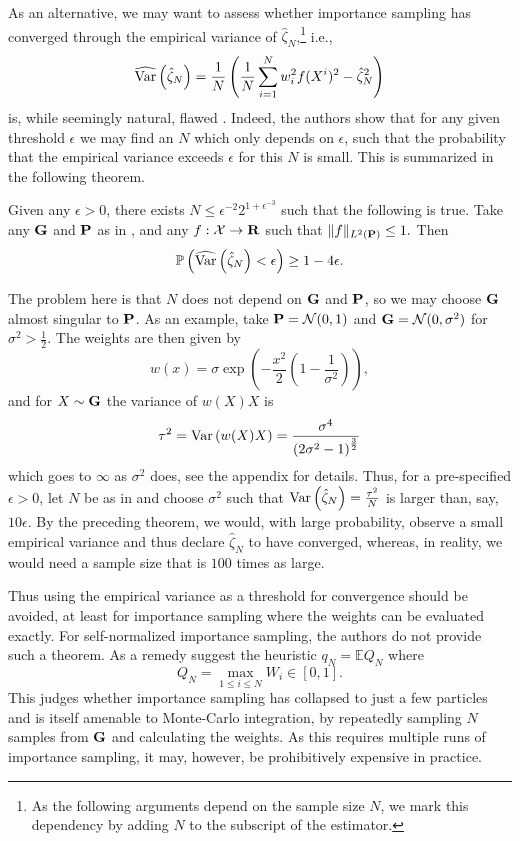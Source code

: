 As an alternative, we may want to assess whether importance sampling has converged through the empirical variance of $\hat \zeta_{N}$,\footnote{As the following arguments depend on the sample size $N$, we mark this dependency by adding $N$ to the subscript of the estimator.} i.e., 
$$
\widehat\var \left( \hat\zeta_{N} \right) = \frac{1}{N}\left(\frac{1}{N} \sum_{i = 1}^N w_{i}^{2} f(X^{i})^{2} - \hat \zeta_{N}^{2}\right)
$$
is, while seemingly natural, flawed \citep{Chatterjee2018Sample}.
Indeed, the authors show that for any given threshold $\epsilon$ we may find an $N$ which only depends on $\epsilon$, such that the probability that the empirical variance exceeds $\epsilon$ for this $N$ is small. This is summarized in the following theorem.

\begin{theorem}
    \label{thm:variance_failure}
    Given any $\epsilon > 0$, there exists $N \leq \epsilon^{-2} 2^{1 + \epsilon^{-3}}$ such that the following is true. Take any $\G$ and $\P$ as in , and any $f: \mathcal X \to \R$ such that $ \lVert f \rVert_{L^{2}(\P)} \leq 1.$ Then 
    $$
        \mathbb P \left( \widehat \var \left( \hat \zeta_{N} \right) < \epsilon\right) \geq 1 - 4 \epsilon.
    $$
\end{theorem}

The problem here is that $N$ does not depend on $\G$ and $\P$, so we may choose $\G$ almost singular to $\P$. As an example, take $\P = \mathcal N(0, 1)$ and $\G = \mathcal N(0, \sigma^{2})$ for $\sigma^{2} > \frac{1}{2}$. The weights are then given by $$w(x) = \sigma \exp \left( - \frac{x^{2}}{2} \left( 1 - \frac{1}{\sigma^{2}} \right) \right),$$
and for $X \sim \G$ the variance of $w(X)X$ is 
\begin{align}
    \label{eq:variance-wxx}
\tau^{2} = \var \left( w(X)X \right) = \frac{\sigma^{4}}{\left( 2 \sigma^{2} - 1 \right)^{\frac{3}{2}}}
\end{align}
which goes to $\infty$ as $\sigma^2$ does, see the appendix for details. Thus, for a pre-specified $\epsilon > 0$, let $N$ be as in  and choose $\sigma^{2}$ such that $\var \left( \hat\zeta_{N} \right) = \frac {\tau^{2}}N$ is larger than, say, $10\epsilon$. By the preceding theorem, we would, with large probability, observe a small empirical variance and thus declare $\hat\zeta_{N}$ to have converged, whereas, in reality, we would need a sample size that is $100$ times as large.

Thus using the empirical variance as a threshold for convergence should be avoided, at least for importance sampling where the weights can be evaluated exactly. For self-normalized importance sampling, the authors do not provide such a theorem. As a remedy \citep{Chatterjee2018Sample} suggest the heuristic $q_{N} = \mathbb E Q_{N}$ where
$$
Q_{N} = \max_{1\leq i\leq N} W_{i} \in [0, 1].
$$
This judges whether importance sampling has collapsed to just a few particles and is itself amenable to Monte-Carlo integration, by repeatedly sampling $N$ samples from $\G$ and calculating the weights. 
As this requires multiple runs of importance sampling, it may, however, be prohibitively expensive in practice.

